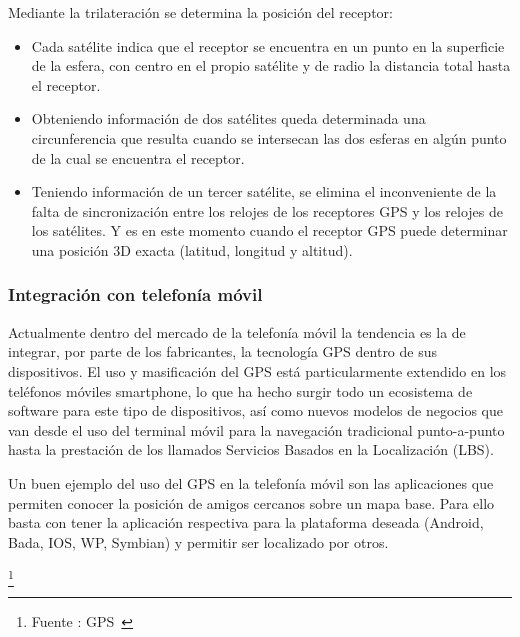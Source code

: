 Mediante la trilateración se determina la posición del receptor:
\begin{itemize}

\item Cada satélite indica que el receptor se encuentra en un punto
 en la superficie de la esfera, con centro en el propio satélite y 
de radio la distancia total hasta el receptor.
\item Obteniendo información de dos satélites queda determinada
 una circunferencia que resulta cuando se intersecan las dos esferas 
en algún punto de la cual se encuentra el receptor.
\item Teniendo información de un tercer satélite, se elimina el 
inconveniente de la falta de sincronización entre los relojes de los
 receptores GPS y los relojes de los satélites. Y es en este momento 
cuando el receptor GPS puede determinar una posición 3D exacta
 (latitud, longitud y altitud).
\end{itemize}
\subsubsection{Integración con telefonía móvil}
Actualmente dentro del mercado de la telefonía móvil la tendencia 
es la de integrar, por parte de los fabricantes, la tecnología GPS 
dentro de sus dispositivos. El uso y masificación del GPS está 
particularmente extendido en los teléfonos móviles smartphone, lo que
 ha hecho surgir todo un ecosistema de software para este tipo de
 dispositivos, así como nuevos modelos de negocios que van desde el
 uso del terminal móvil para la navegación tradicional punto-a-punto 
hasta la prestación de los llamados Servicios Basados en la Localización (LBS).

Un buen ejemplo del uso del GPS en la telefonía móvil son las 
aplicaciones que permiten conocer la posición de amigos cercanos
sobre un mapa base. Para ello basta con tener la aplicación
 respectiva para la plataforma deseada (Android, Bada, IOS, WP, Symbian)
 y permitir ser localizado por otros.

\footnote{Fuente : GPS~\cite{GPS}}